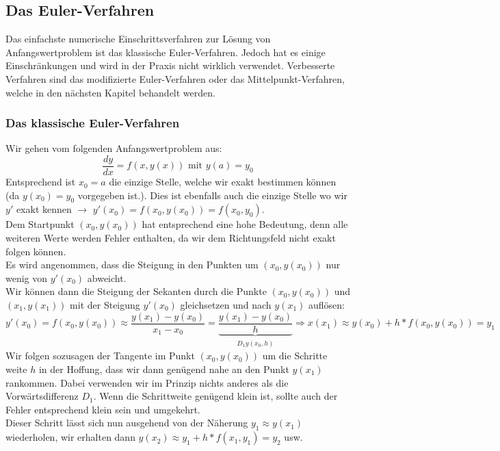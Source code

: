 \documentclass{article}
\theoremstyle{satz}
\theoremstyle{definition}
\begin{document}
\subsection{Das Euler-Verfahren}
Das einfachste numerische Einschrittsverfahren zur Lösung von Anfangswertproblem ist das klassische Euler-Verfahren. Jedoch hat es einige Einschränkungen und wird in der Praxis nicht wirklich verwendet. Verbesserte Verfahren sind das modifizierte Euler-Verfahren oder das Mittelpunkt-Verfahren, welche in den nächsten Kapitel behandelt werden.

\subsubsection{Das klassische Euler-Verfahren}
Wir gehen vom folgenden Anfangswertproblem aus:
\begin{equation}
\frac{dy}{dx} = f(x, y(x)) \textrm{ mit } y(a) = y_0
\end{equation}
Entsprechend ist $x_0 = a$ die einzige Stelle, welche wir exakt bestimmen können (da $y(x_0) = y_0$ vorgegeben ist.). Dies ist ebenfalls auch die einzige Stelle wo wir $y'$ exakt kennen $\rightarrow$ $y'(x_0) = f(x_0,y(x_0)) = f(x_0, y_0)$.\\
Dem Startpunkt $(x_0, y(x_0))$ hat entsprechend eine hohe Bedeutung, denn alle weiteren Werte werden Fehler enthalten, da wir dem Richtungsfeld nicht exakt folgen können.\\
Es wird angenommen, dass die Steigung in den Punkten um $(x_0, y(x_0))$ nur wenig von $y'(x_0)$ abweicht. \\
Wir können dann die Steigung der Sekanten durch die Punkte $(x_0,y(x_0))$ und $(x_1,y(x_1))$ mit der Steigung $y'(x_0)$ gleichsetzen und nach $y(x_1)$ auflösen:
\begin{equation}
y'(x_0) = f(x_0, y(x_0)) \approx \frac{y(x_1)-y(x_0)}{x_1 - x_0} = \underbrace{\frac{y(x_1)-y(x_0)}{h}}_{\substack{D_1 y(x_0,h)}} \Rightarrow x(x_1) \approx y(x_0)+h*f(x_0,y(x_0))=y_1
\end{equation}
Wir folgen sozusagen der Tangente im Punkt $(x_0, y(x_0))$ um die Schritte weite $h$ in der Hoffung, dass wir dann genügend nahe an den Punkt $y(x_1)$ rankommen. Dabei verwenden wir im Prinzip nichts anderes als die Vorwärtsdifferenz $D_1$.  Wenn die Schrittweite genügend klein ist, sollte auch der Fehler entsprechend klein sein und umgekehrt.\\
Dieser Schritt lässt sich nun ausgehend von der Näherung $y_1 \approx y(x_1)$ wiederholen, wir erhalten dann $y(x_2) \approx y_1+h*f(x_1, y_1) = y_2$ usw. 
\end{document}

